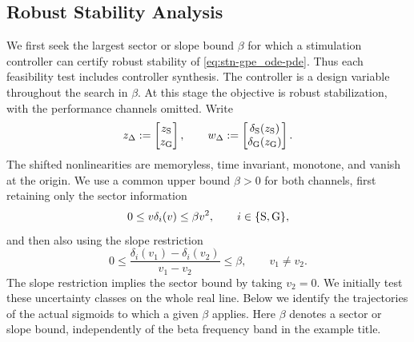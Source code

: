 \subsection{Robust Stability Analysis}
We first seek the largest sector or slope bound $\beta$ for which a
stimulation controller can certify robust stability of
\eqref{eq:stn-gpe_ode-pde}. Thus each feasibility test includes controller
synthesis. The controller is a design variable throughout the search
in $\beta$. At this stage the objective is robust stabilization, with
the performance channels omitted. Write
\begin{equation*}
z_\Delta:=\begin{bmatrix}z_{{\mathrm{S}}}\\z_{{\mathrm{G}}}\end{bmatrix},
\qquad
w_\Delta:=\begin{bmatrix}\delta_{{\mathrm{S}}}(z_{{\mathrm{S}}})\\
                 \delta_{{\mathrm{G}}}(z_{{\mathrm{G}}})\end{bmatrix}.
\end{equation*}
The shifted nonlinearities are memoryless, time invariant, monotone, and
vanish at the origin. We use a common upper bound $\beta>0$ for both
channels, first retaining only the sector information
\begin{equation}\label{eq:stn-gpe-sector-bound}
0\leq v\delta_i(v)\leq\beta v^2,
\qquad i\in\{{\mathrm{S}},{\mathrm{G}}\},
\end{equation}
and then also using the slope restriction
\begin{equation}\label{eq:stn-gpe-slope-bound}
0\leq\frac{\delta_i(v_1)-\delta_i(v_2)}{v_1-v_2}\leq\beta,
\qquad v_1\neq v_2.
\end{equation}
The slope restriction implies the sector bound by taking $v_2=0$.
We initially test these uncertainty classes on the whole real line. Below
we identify the trajectories of the actual sigmoids to which a given
$\beta$ applies. Here $\beta$ denotes a sector or slope bound, independently
of the beta frequency band in the example title.

